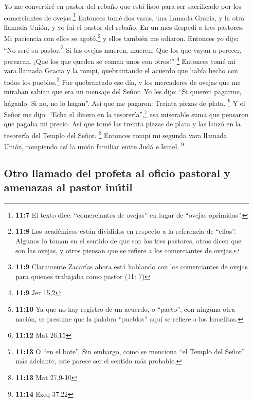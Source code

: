  Yo me convertiré en pastor del rebaño que está listo para
ser sacrificado por los comerciantes de ovejas.\footnote{\textbf{11:7}
  El texto dice: ``comerciantes de ovejas'' en lugar de ``ovejas
  oprimidas''.} Entonces tomé dos varas, una llamada Gracia, y la otra
llamada Unión, y yo fui el pastor del rebaño.  En un mes
despedí a tres pastores. Mi paciencia con ellos se agotó,\footnote{\textbf{11:8}
  Los académicos están divididos en respecto a la referencia de
  ``ellos''. Algunos lo toman en el sentido de que son los tres
  pastores, otros dicen que son las ovejas, y otros piensan que se
  refiere a los comerciantes de ovejas.} y ellos también me odiaron.
 Entonces yo dije: ``No seré su pastor.\footnote{\textbf{11:9}
  Claramente Zacarías ahora está hablando con los comerciantes de ovejas
  para quienes trabajaba como pastor (11: 7)} Si las ovejas mueren,
mueren. Que los que vayan a perecer, perezcan. ¡Que los que queden se
coman unos con otros!'' \footnote{\textbf{11:9} Jer 15,2}
 Entonces tomé mi vara llamada Gracia y la rompí,
quebrantando el acuerdo que había hecho con todos los
pueblos.\footnote{\textbf{11:10} Ya que no hay registro de un acuerdo, o
  ``pacto'', con ninguna otra nación, se presume que la palabra
  ``pueblos'' aquí se refiere a los Israelitas.}  Fue
quebrantado ese día, y los mercaderes de ovejas que me miraban sabían
que era un mensaje del Señor.  Yo les dije: ``Si quieren
pagarme, háganlo. Si no, no lo hagan''. Así que me pagaron: Treinta
piezas de plata. \footnote{\textbf{11:12} Mat 26,15}  Y
el Señor me dijo: ``Echa el dinero en la tesorería'',\footnote{\textbf{11:13}
  O ``en el bote''. Sin embargo, como se menciona ``el Templo del
  Señor'' más adelante, este parece ser el sentido más probable.} esa
miserable suma que pensaron que pagaba mi precio. Así que tomé las
treinta piezas de plata y las lanzó en la tesorería del Templo del
Señor. \footnote{\textbf{11:13} Mat 27,9-10}  Entonces
rompí mi segunda vara llamada Unión, rompiendo así la unión familiar
entre Judá e Israel. \footnote{\textbf{11:14} Ezeq 37,22}

\hypertarget{otro-llamado-del-profeta-al-oficio-pastoral-y-amenazas-al-pastor-inuxfatil}{%
\subsection{Otro llamado del profeta al oficio pastoral y amenazas al
pastor
inútil}\label{otro-llamado-del-profeta-al-oficio-pastoral-y-amenazas-al-pastor-inuxfatil}}

